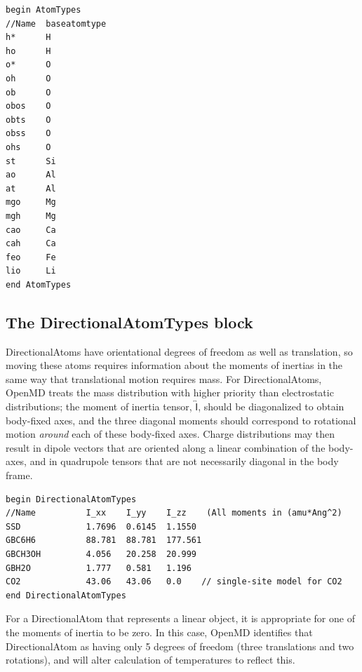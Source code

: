\documentclass[]{book}
\begin{document}
\begin{lstlisting}[caption={[An example of a AtomTypes block.] A
simple example of an AtomTypes block which
shows how multiple types can inherit from the same base type.},
label={sch:atomTypesBlock}]
begin AtomTypes    
//Name  baseatomtype
h*      H
ho      H
o*      O
oh      O
ob      O
obos    O
obts    O
obss    O
ohs     O
st      Si
ao      Al
at      Al
mgo     Mg
mgh     Mg
cao     Ca
cah     Ca
feo     Fe
lio     Li
end AtomTypes
\end{lstlisting}

\subsection{\label{section:ffDirectionalAtom}The DirectionalAtomTypes
  block}
DirectionalAtoms have orientational degrees of freedom as well as
translation, so moving these atoms requires information about the
moments of inertias in the same way that translational motion requires
mass.  For DirectionalAtoms, OpenMD treats the mass distribution with
higher priority than electrostatic distributions; the moment of
inertia tensor, $\overleftrightarrow{\mathsf I}$, should be
diagonalized to obtain body-fixed axes, and the three diagonal moments
should correspond to rotational motion \textit{around} each of these
body-fixed axes.  Charge distributions may then result in dipole
vectors that are oriented along a linear combination of the body-axes,
and in quadrupole tensors that are not necessarily diagonal in the
body frame. 

\begin{lstlisting}[caption={[An example of a DirectionalAtomTypes block.] A
simple example of a DirectionalAtomTypes block.},
label={sch:datomTypesBlock}]
begin DirectionalAtomTypes
//Name          I_xx    I_yy    I_zz    (All moments in (amu*Ang^2)
SSD             1.7696  0.6145  1.1550  
GBC6H6          88.781  88.781  177.561
GBCH3OH         4.056   20.258  20.999
GBH2O           1.777   0.581   1.196
CO2             43.06   43.06   0.0    // single-site model for CO2
end DirectionalAtomTypes                    

\end{lstlisting}

For a DirectionalAtom that represents a linear object, it is
appropriate for one of the moments of inertia to be zero.  In this
case, OpenMD identifies that DirectionalAtom as having only 5 degrees
of freedom (three translations and two rotations), and will alter
calculation of temperatures to reflect this.
\end{document}
